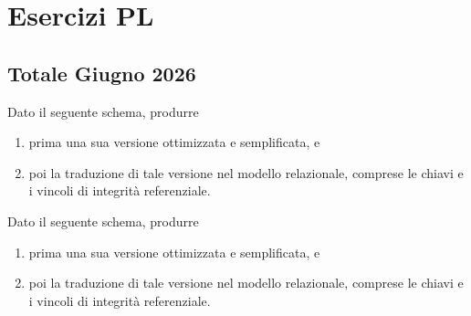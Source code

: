 \usetikzlibrary{shapes.geometric, arrows.meta, positioning, calc}

\chapter{Esercizi PL}

\section{Totale Giugno 2026}
Dato il seguente schema, produrre
\begin{enumerate}
    \item prima una sua versione ottimizzata e semplificata, e
    \item poi la traduzione di tale versione nel modello relazionale, comprese le chiavi e i vincoli di integrità referenziale.
\end{enumerate}

Dato il seguente schema, produrre
\begin{enumerate}
    \item prima una sua versione ottimizzata e semplificata, e
    \item poi la traduzione di tale versione nel modello relazionale, comprese le chiavi e i vincoli di integrità referenziale.
\end{enumerate}

